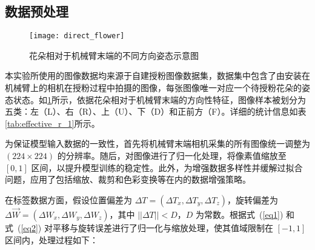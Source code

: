 \subsection{数据预处理}
\begin{figure}[htb]
	\texttt{[image: direct\_flower]}
	\caption[花朵相对于机械臂末端的不同方向姿态示意图]{花朵相对于机械臂末端的不同方向姿态示意图} %
	\label{fig:effective_r_1}
\end{figure}
本实验所使用的图像数据均来源于自建授粉图像数据集，数据集中包含了由安装在机械臂上的相机在授粉过程中拍摄的图像，每张图像唯一对应一个待授粉花朵的姿态状态。如\cref{fig:effective_r_1}所示，依据花朵相对于机械臂末端的方向性特征，图像样本被划分为五类：左（L）、右（R）、上（U）、下（D）和正前方（F）。详细的统计信息如表\cref{tab:effective_r_1}所示。




\begin{table}[htbp]
	\caption[数据集中不同方向花朵图像的数量统计]{数据集中不同方向花朵图像的数量统计}
	\label{tab:effective_r_1}
	
\end{table}

为保证模型输入数据的一致性，首先将机械臂末端相机采集的所有图像统一调整为 $(224 \times 224)$ 的分辨率。随后，对图像进行了归一化处理，将像素值缩放至 $[0, 1]$ 区间，以提升模型训练的稳定性。此外，为增强数据多样性并缓解过拟合问题，应用了包括缩放、裁剪和色彩变换等在内的数据增强策略。

在标签数据方面，假设位置偏差为 $\Delta T = (\Delta T_{x}, \Delta T_{y}, \Delta T_{z})$，旋转偏差为 $\Delta \overrightarrow{W} = (\Delta W_{x}, \Delta W_{y}, \Delta W_{z})$，其中 $||\Delta T|| < D$，$D$ 为常数。根据式~(\ref{eq1}) 和式~(\ref{eq2}) 对平移与旋转误差进行了归一化与缩放处理，使其值域限制在 $[-1, 1]$ 区间内，处理过程如下：

